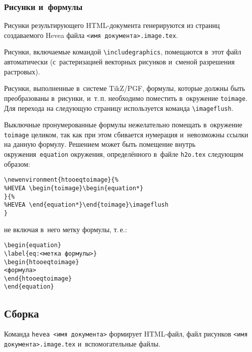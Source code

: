 \documentclass[10pt, a5paper]{article}
\begin{document}
\subsubsection*{Рисунки и~формулы}
Рисунки результирующего HTML-документа генерируются из страниц создаваемого Hevea файла \verb!<имя документа>.image.tex!.

Рисунки, включаемые командой \verb!\includegraphics!, помещаются в~этот файл автоматически (с~растеризацией векторных рисунков и~сменой разрешения растровых).

Рисунки, выполненные в~системе TikZ/PGF, формулы, которые должны быть преобразованы в~рисунки, и~т.\,п. необходимо поместить в~окружение \verb!toimage!. Для перехода на следующую страницу используется команда \verb!\imageflush!.

Выключные пронумерованные формулы нежелательно помещать в~окружение \verb!toimage! целиком, так как при этом сбивается нумерация и~невозможны ссылки на данную формулу.
Решением может быть помещение внутрь окружения~\verb!equation! окружения, определённого в~файле \verb!h2o.tex! следующим образом:
\begin{verbatim}
\newenvironment{htooeqtoimage}{%
%HEVEA \begin{toimage}\begin{equation*}
}{%
%HEVEA \end{equation*}\end{toimage}\imageflush
}
\end{verbatim}%
не включая в~него метку формулы, т.\,е.:
\begin{verbatim}
\begin{equation}
\label{eq:<метка формулы>}
\begin{htooeqtoimage}
<формула>
\end{htooeqtoimage}
\end{equation}
\end{verbatim}

% 


\subsection*{Сборка}
Команда \verb!hevea <имя документа>! формирует HTML-файл, файл рисунков \texttt{<имя документа>.image.tex} и~вспомогательные файлы. 
\end{document}

